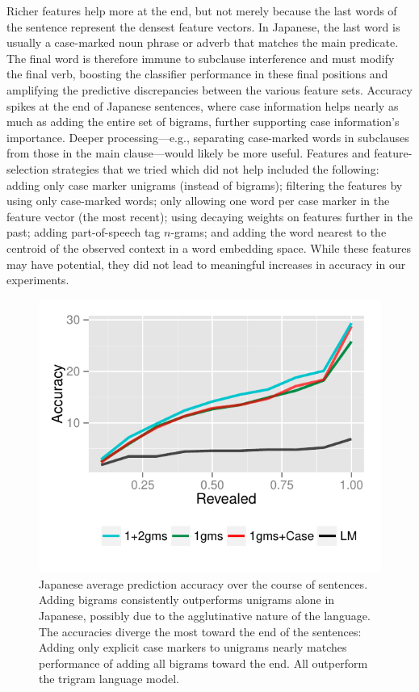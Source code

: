 Richer features help more at the end, but not merely because the last
words of the sentence represent the densest feature vectors.  In
Japanese, the last word is usually a case-marked noun phrase or adverb
that matches the main predicate.  The final word is therefore immune
to subclause interference and must modify the final verb, boosting the
classifier performance in these final positions and amplifying the
predictive discrepancies between the various feature sets.  Accuracy
spikes at the end of Japanese sentences, where case information helps
nearly as much as adding the entire set of bigrams, further supporting
case information's importance.  Deeper processing---e.g., separating
case-marked words in subclauses from those in the main clause---would
likely be more useful.  Features and feature-selection strategies that
we tried which did not help included the following: adding only case
marker unigrams (instead of bigrams); filtering the features by using
only case-marked words; only allowing one word per case marker in the
feature vector (the most recent); using decaying weights on features
further in the past; adding part-of-speech tag $n$-grams; and adding
the word nearest to the centroid of the observed context in a word
embedding space.  While these features may have potential, they did
not lead to meaningful increases in accuracy in our experiments.

\begin{figure}[t!]
 \begin{center} \includegraphics[width=1.0\linewidth]{2016_conll_verbpred/figures/japanese_top50_comparison_newsplit}
\caption{Japanese average prediction accuracy over the course of
  sentences. Adding bigrams consistently outperforms unigrams alone in
  Japanese, possibly due to the agglutinative nature of the language.
  The accuracies diverge the most toward the end of the sentences:
  Adding only explicit case markers to unigrams nearly matches
  performance of adding all bigrams toward the end. All outperform the
  trigram language model.}  \label{fig:japanese_unibi}
\end{center}
\end{figure}